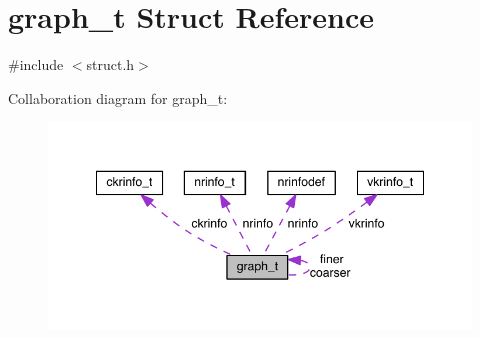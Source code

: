 \hypertarget{structgraph__t}{}\section{graph\+\_\+t Struct Reference}
\label{structgraph__t}


{\ttfamily \#include $<$struct.\+h$>$}



Collaboration diagram for graph\+\_\+t\+:\nopagebreak
\begin{figure}[H]
\begin{center}
\leavevmode
\includegraphics[width=348pt]{structgraph__t__coll__graph}
\end{center}
\end{figure}
